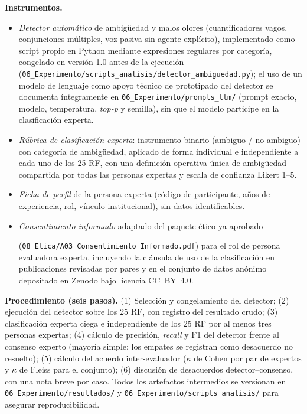 \documentclass[11pt,a4paper]{article}
\begin{document}
\textbf{Instrumentos.}
\begin{itemize}[nosep]
\item \textit{Detector automático} de ambigüedad y malos olores (cuantificadores vagos, conjunciones múltiples, voz pasiva sin agente explícito), implementado como script propio en Python mediante expresiones regulares por categoría, congelado en versión 1.0 antes de la ejecución (\texttt{06\_Experimento/scripts\_analisis/detector\_ambiguedad.py}); el uso de un modelo de lenguaje como apoyo técnico de prototipado del detector se documenta íntegramente en \texttt{06\_Experimento/prompts\_llm/} (prompt exacto, modelo, temperatura, \textit{top-p} y semilla), sin que el modelo participe en la clasificación experta.
\item \textit{Rúbrica de clasificación experta}: instrumento binario (ambiguo / no ambiguo) con categoría de ambigüedad, aplicado de forma individual e independiente a cada uno de los 25 RF, con una definición operativa única de ambigüedad compartida por todas las personas expertas y escala de confianza Likert 1--5.
\item \textit{Ficha de perfil} de la persona experta (código de participante, años de experiencia, rol, vínculo institucional), sin datos identificables.
\item \textit{Consentimiento informado} adaptado del paquete ético ya aprobado 

(\texttt{08\_Etica/A03\_Consentimiento\_Informado.pdf}) para el rol de persona evaluadora experta, incluyendo la cláusula de uso de la clasificación en publicaciones revisadas por pares y en el conjunto de datos anónimo depositado en Zenodo bajo licencia CC~BY~4.0.
\end{itemize}

\textbf{Procedimiento (seis pasos).} (1) Selección y congelamiento del detector; (2) ejecución del detector sobre los 25 RF, con registro del resultado crudo; (3) clasificación experta ciega e independiente de los 25 RF por al menos tres personas expertas; (4) cálculo de precisión, \textit{recall} y F1 del detector frente al consenso experto (mayoría simple; los empates se registran como desacuerdo no resuelto); (5) cálculo del acuerdo inter-evaluador (\(\kappa\) de Cohen por par de expertos y \(\kappa\) de Fleiss para el conjunto); (6) discusión de desacuerdos detector--consenso, con una nota breve por caso. Todos los artefactos intermedios se versionan en \texttt{06\_Experimento/resultados/} y \texttt{06\_Experimento/scripts\_analisis/} para asegurar reproducibilidad.
\end{document}
